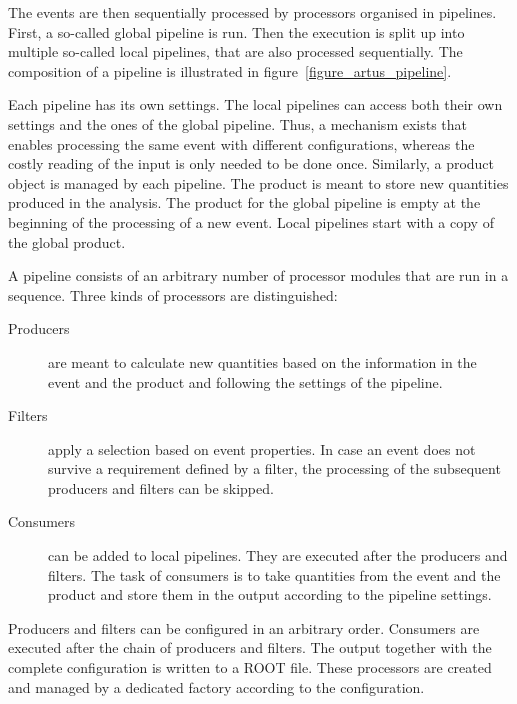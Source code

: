 \documentclass[3p]{elsarticle}
\begin{document}
The events are then sequentially processed by processors organised in pipelines.
First, a so-called global pipeline is run.
Then the execution is split up into multiple so-called local pipelines, that are also processed sequentially.
The composition of a pipeline is illustrated in figure~\ref{figure_artus_pipeline}.

Each pipeline has its own settings.
The local pipelines can access both their own settings and the ones of the global pipeline.
Thus, a mechanism exists that enables processing the same event with different configurations, whereas the costly reading of the input is only needed to be done once.
Similarly, a product object is managed by each pipeline.
The product is meant to store new quantities produced in the analysis.
The product for the global pipeline is empty at the beginning of the processing of a new event.
Local pipelines start with a copy of the global product.

A pipeline consists of an arbitrary number of processor modules that are run in a sequence.
Three kinds of processors are distinguished:
\begin{description}
\item[Producers] are meant to calculate new quantities based on the information in the event and the product and following the settings of the pipeline.
\item[Filters] apply a selection based on event properties.
In case an event does not survive a requirement defined by a filter, the processing of the subsequent producers and filters can be skipped.
\item[Consumers] can be added to local pipelines.
They are executed after the producers and filters.
The task of consumers is to take quantities from the event and the product and store them in the output according to the pipeline settings.
\end{description}
Producers and filters can be configured in an arbitrary order.
Consumers are executed after the chain of producers and filters.
The output together with the complete configuration is written to a ROOT  file.
These processors are created and managed by a dedicated factory according to the configuration.
\end{document}

